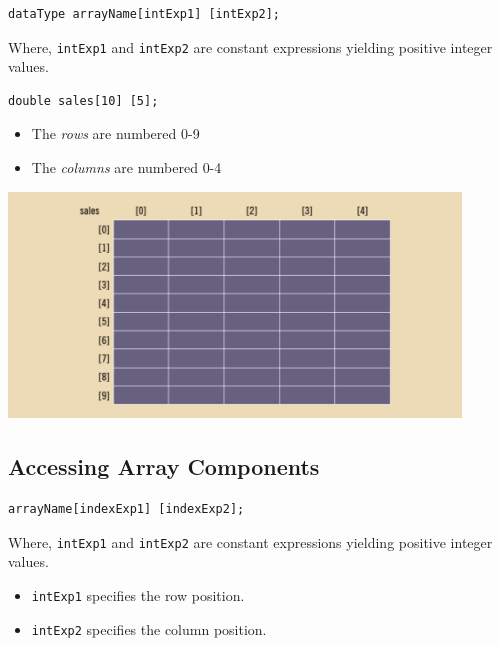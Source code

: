 \documentclass{article}
\begin{document}
\begin{lstlisting}[caption={Two-Dimensional Array Syntax}]
  dataType arrayName[intExp1] [intExp2];
\end{lstlisting}

Where, \texttt{intExp1} and \texttt{intExp2} are constant expressions yielding
positive integer values.

\begin{lstlisting}[caption={Two-Dimensional Array Example}]
  double sales[10] [5];
\end{lstlisting}

\begin{itemize}
  \item The \textit{rows} are numbered 0-9
  \item The \textit{columns} are numbered 0-4
\end{itemize}

\begin{center}
    \includegraphics[width=0.9\textwidth]{nD-arr-declaration-table.png}
\end{center}

\subsection{Accessing Array Components}

\begin{lstlisting}[caption={Two-Dimensional Array Indexing Syntax}]
  arrayName[indexExp1] [indexExp2];
\end{lstlisting}

Where, \texttt{intExp1} and \texttt{intExp2} are constant expressions yielding
positive integer values.

\begin{itemize}
  \item \texttt{intExp1} specifies the row position.
  \item \texttt{intExp2} specifies the column position.
\end{itemize}
\end{document}
